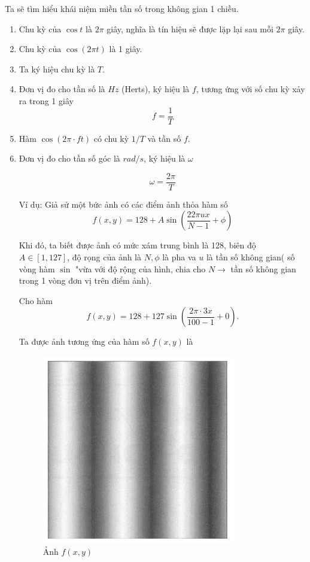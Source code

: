 \documentclass[12pt,a4paper]{report}
\numberwithin{equation}{section}
\theoremstyle{definition} %
\begin{document}
Ta sẽ tìm hiểu khái niệm miền tần số trong không gian 1 chiều.

\begin{enumerate}
    \item Chu kỳ của $\cos t$ là $2\pi$ giây, nghĩa là tín hiệu sẽ được lặp lại sau mỗi $2\pi$ giây.

    \item Chu kỳ của $\cos(2\pi t)$ là 1 giây.

\item Ta ký hiệu chu kỳ là $T$.

\item Đơn vị đo cho tần số là $Hz$ (Herts), ký hiệu là $f$, tương ứng với số chu kỳ xảy ra trong 1 giây
$$f=\dfrac{1}{T}$$

\item Hàm $\cos(2\pi \cdot ft)$ có chu kỳ $1/T$ và tần số $f$.

\item Đơn vị đo cho tần số góc là $rad/s$, ký hiệu là $\omega$

$$\omega = \dfrac{2\pi}{T}$$

Ví dụ: Giả sử một bức ảnh có các điểm ảnh thỏa hàm số
$$f(x,y)=128+A \sin \left(\dfrac{22\pi u x}{N-1}+\phi\right)$$

Khi đó, ta biết được ảnh có mức xám trung bình là 128, biên độ $A \in [1,127]$, độ rọng của ảnh là $N, \phi$ là pha va $u$ là tần số không gian( số vòng hàm $\sin $ "vừa với độ rộng của hình, chia cho $N \rightarrow $ tần số không gian trong 1 vòng đơn vị trên  điểm ảnh).

Cho hàm
$$f(x,y)=128+127 \sin \left(\dfrac{2\pi \cdot 3x}{100-1}+0\right).$$

Ta được ảnh tương ứng của hàm số $f(x,y)$ là

\begin{figure}[H]
\label{1.1}
    \centering
\includegraphics[width=0.5\linewidth]{img/Screenshot 2025-10-01 132803.png}
    \caption{Ảnh $f(x,y)$}
\end{figure}

\end{enumerate}
\end{document}
